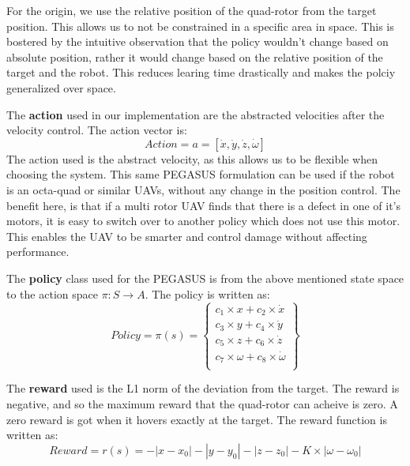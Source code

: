 \documentclass[hidelinks,BTech]{iitmdiss}
\begin{document}
For the origin, we use the relative position of the quad-rotor from the target position. This allows us to not be constrained in a specific area in space. This is bostered by the intuitive observation that the policy wouldn't change based on absolute position, rather it would change based on the relative position of the target and the robot. This reduces learing time drastically and makes the polciy generalized over space.

The {\bf action} used in our implementation are the abstracted velocities after the velocity control. The action vector is:
\begin{equation}
  Action = a = [\dot{x}, \dot{y}, \dot{z}, \dot{\omega}]
\end{equation}
The action used is the abstract velocity, as this allows us to be flexible when choosing the system. This same PEGASUS formulation can be used if the robot is an octa-quad or similar UAVs, without any change in the position control. The benefit here, is that if a multi rotor UAV finds that there is a defect in one of it's motors, it is easy to switch over to another policy which does not use this motor. This enables the UAV to be smarter and control damage without affecting performance.

The {\bf policy} class used for the PEGASUS is from the above mentioned state space to the action space $\pi: S \rightarrow A$. The policy is written as:
\begin{equation}
  Policy = \pi(s) = \left\{
    \begin{array}{c}
      c_1 \times x + c_2 \times \dot{x} \\
      c_3 \times y + c_4 \times \dot{y} \\
      c_5 \times z + c_6 \times \dot{z} \\
      c_7 \times \omega + c_8 \times \dot{\omega} \\
    \end{array}
  \right\}
\end{equation}


The {\bf reward} used is the L1 norm of the deviation from the target. The reward is negative, and so the maximum reward that the quad-rotor can acheive is zero. A zero reward is got when it hovers exactly at the target. The reward function is written as:
\begin{equation}
  Reward = r(s) = - |x - x_0| - |y - y_0| - |z - z_0| - K \times |\omega - \omega_0|
\end{equation}
\end{document}
